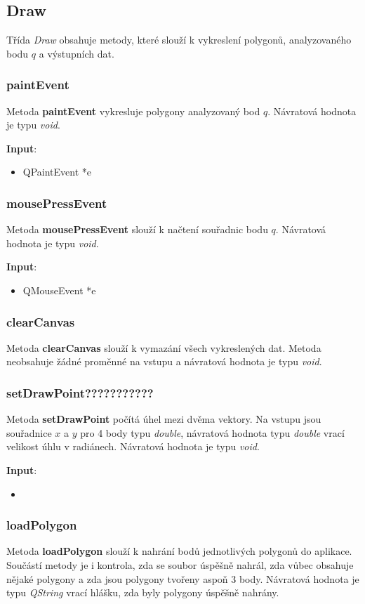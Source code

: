 \documentclass[a4paper, 12pt]{article}
\begin{document}
\subsection{Draw}
Třída \textsl{Draw} obsahuje metody, které slouží k vykreslení polygonů, analyzovaného bodu $q$ a výstupních dat.

\subsubsection{paintEvent}
Metoda \textbf{paintEvent} vykresluje polygony analyzovaný bod $q$. Návratová hodnota je typu \textsl{void}.

\textbf{Input}:
\begin{itemize}
\item QPaintEvent *e
\end{itemize}

\subsubsection{mousePressEvent}
Metoda \textbf{mousePressEvent} slouží k načtení souřadnic bodu $q$. Návratová hodnota je typu \textsl{void}.

\textbf{Input}:
\begin{itemize}
\item QMouseEvent *e
\end{itemize}

\subsubsection{clearCanvas}
Metoda \textbf{clearCanvas} slouží k vymazání všech vykreslených dat. Metoda neobsahuje žádné proměnné na vstupu a návratová hodnota je typu \textsl{void}.

\subsubsection{setDrawPoint???????????}
Metoda \textbf{setDrawPoint} počítá úhel mezi dvěma vektory. Na vstupu jsou souřadnice $x$ a $y$ pro 4 body typu \textit{double}, návratová hodnota typu \textit{double} vrací velikost úhlu v radiánech. Návratová hodnota je typu \textsl{void}.

\textbf{Input}:
\begin{itemize}
\item 
\end{itemize}

\subsubsection{loadPolygon}
Metoda \textbf{loadPolygon} slouží k nahrání bodů jednotlivých polygonů do aplikace.  Součástí metody je i kontrola, zda se soubor úspěšně nahrál, zda vůbec obsahuje nějaké polygony a zda jsou polygony tvořeny aspoň 3 body. Návratová hodnota je typu \textsl{QString} vrací hlášku, zda byly polygony úspěšně nahrány.
\end{document}
